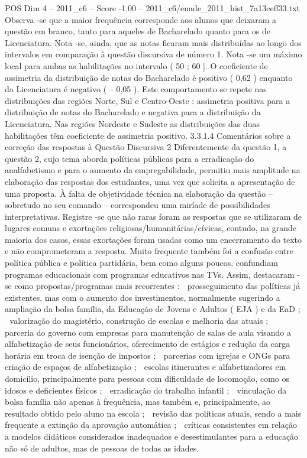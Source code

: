 \begin{textsample}{POS Dim 4 – 2011\_c6 – Score -1.00 – 2011\_c6/enade\_2011\_hist\_7a13ceff33.txt}
Observa -se que a maior frequência corresponde aos alunos que deixaram a questão em branco, tanto para aqueles de Bacharelado quanto para os de Licenciatura.
Nota -se, ainda, que as notas ficaram mais distribuídas ao longo dos intervalos em comparação à questão discursiva de número 1.
Nota -se um máximo local para ambas as habilitações no intervalo ( 50 ; 60 ].
O coeficiente de assimetria da distribuição de notas do Bacharelado é positivo ( 0,62 ) enquanto da Licenciatura é negativo ( – 0,05 ).
Este comportamento se repete nas distribuições das regiões Norte, Sul e Centro-Oeste : assimetria positiva para a distribuição de notas do Bacharelado e negativa para a distribuição da Licenciatura.
Nas regiões Nordeste e Sudeste as distribuições das duas habilitações têm coeficiente de assimetria positivo. 3.3.1.4 Comentários sobre a correção das respostas à Questão Discursiva 2 Diferentemente da questão 1, a questão 2, cujo tema aborda políticas públicas para a erradicação do analfabetismo e para o aumento da empregabilidade, permitiu mais amplitude na elaboração das respostas dos estudantes, uma vez que solicita a apresentação de uma proposta.
À falta de objetividade técnica na elaboração da questão – sobretudo no seu comando – correspondeu uma miríade de possibilidades interpretativas.
Registre -se que não raras foram as respostas que se utilizaram de lugares comuns e exortações religiosas/humanitárias/cívicas, contudo, na grande maioria dos casos, essas exortações foram usadas como um encerramento do texto e não comprometeram a resposta.
Muito frequente também foi a confusão entre política pública e política partidária, bem como alguns poucos, confundiam programas educacionais com programas educativos nas TVs.
Assim, destacaram -se como propostas/programas mais recorrentes :  prosseguimento das políticas já existentes, mas com o aumento dos investimentos, normalmente sugerindo a ampliação da bolsa família, da Educação de Jovens e Adultos ( EJA ) e da EaD ;  valorização do magistério, construção de escolas e melhoria das atuais ;  parceria do governo com empresas para manutenção de salas de aula visando a alfabetização de seus funcionários, oferecimento de estágios e redução da carga horária em troca de isenção de impostos ;  parcerias com igrejas e ONGs para criação de espaços de alfabetização ;  escolas itinerantes e alfabetizadores em domicílio, principalmente para pessoas com dificuldade de locomoção, como os idosos e deficientes físicos ;  erradicação do trabalho infantil ;  vinculação da bolsa família não apenas à frequência, mas também e, principalmente, ao resultado obtido pelo aluno na escola ;  revisão das políticas atuais, sendo a mais frequente a extinção da aprovação automática ;  críticas consistentes em relação a modelos didáticos considerados inadequados e desestimulantes para a educação não só de adultos, mas de pessoas de todas as idades.

\end{textsample}

